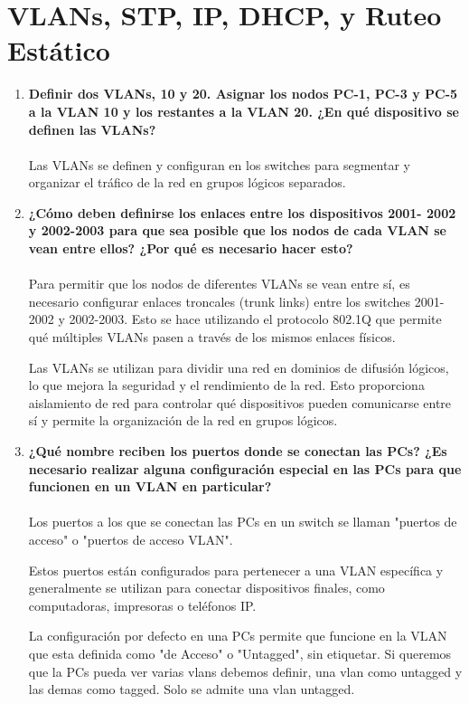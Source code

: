 \documentclass[a4paper]{article}
\begin{document}
\hfill

\section*{VLANs, STP, IP, DHCP, y Ruteo Estático
}
\begin{enumerate}
	\item \textbf{ Definir dos VLANs, 10 y 20. Asignar los nodos PC-1, PC-3 y PC-5
	a la VLAN 10 y los restantes a la VLAN 20. ¿En qué dispositivo se
	definen las VLANs? }
	\\
	\\
Las VLANs se definen y configuran en los switches para segmentar y organizar el tráfico de la red en grupos lógicos separados.
	\item \textbf{¿Cómo deben definirse los enlaces entre los dispositivos 2001-
	2002 y 2002-2003 para que sea posible que los nodos de cada
	VLAN se vean entre ellos? ¿Por qué es necesario hacer esto?}
\\
\\
Para permitir que los nodos de diferentes VLANs se vean entre sí, es necesario configurar enlaces troncales (trunk links) entre los switches 2001-2002 y 2002-2003. Esto se hace utilizando el  protocolo 802.1Q que permite qué múltiples VLANs pasen a través de los mismos enlaces físicos. 

Las VLANs se utilizan para dividir una red en dominios de difusión lógicos, lo que mejora la seguridad y el rendimiento de la red. Esto proporciona aislamiento de red para controlar qué dispositivos pueden comunicarse entre sí y permite la organización de la red en grupos lógicos.

\item \textbf{ ¿Qué nombre reciben los puertos donde se conectan las PCs?
	¿Es necesario realizar alguna configuración especial en las
	PCs para que funcionen en un VLAN en particular?}
\\
\\
Los puertos a los que se conectan las PCs en un switch se llaman "puertos de acceso" o "puertos de acceso VLAN".

Estos puertos están configurados para pertenecer a una VLAN específica y generalmente se utilizan para conectar dispositivos finales, como computadoras, impresoras o teléfonos IP.

La configuración por defecto en una PCs permite que funcione en la VLAN que esta definida como "de Acceso" o "Untagged", sin etiquetar. Si queremos que la PCs pueda ver varias vlans debemos definir, una vlan como untagged y las demas como tagged. Solo se admite una vlan untagged.


\end{enumerate}
\end{document}
